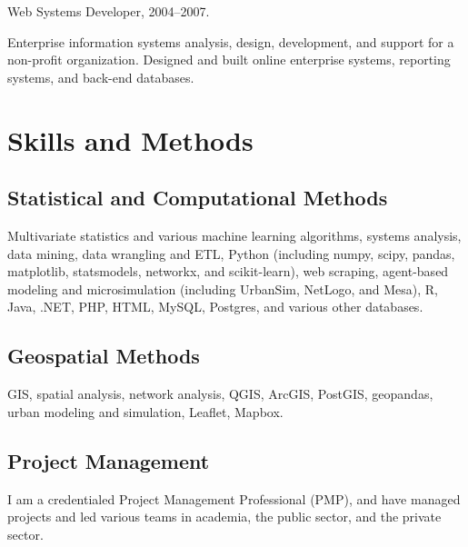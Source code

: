 \documentclass[11pt,letterpaper]{report}
\renewenvironment{itemize}{
  \begin{list}{}{
      \setlength{\leftmargin}{1.75em}
      \setlength{\itemsep}{0.25em}
      \setlength{\parskip}{0em}
      \setlength{\parsep}{0.25em}
    }
}{
  \end{list}
}
\begin{document}
\begin{itemize}
\item Web Systems Developer, 2004--2007.
\item Enterprise information systems analysis, design, development, and support for a non-profit organization. Designed and built online enterprise systems, reporting systems, and back-end databases.
\end{itemize}



\section*{Skills and Methods}

\subsection*{Statistical and Computational Methods}

\begin{itemize}
\item Multivariate statistics and various machine learning algorithms, systems analysis, data mining, data wrangling and ETL, Python (including numpy, scipy, pandas, matplotlib, statsmodels, networkx, and scikit-learn), web scraping, agent-based modeling and microsimulation (including UrbanSim, NetLogo, and Mesa), R, Java, .NET, PHP, HTML, MySQL, Postgres, and various other databases.
\end{itemize}

\subsection*{Geospatial Methods}

\begin{itemize}
\item GIS, spatial analysis, network analysis, QGIS, ArcGIS, PostGIS, geopandas, urban modeling and simulation, Leaflet, Mapbox.
\end{itemize}

\subsection*{Project Management}

\begin{itemize}
\item I am a credentialed Project Management Professional (PMP), and have managed projects and led various teams in academia, the public sector, and the private sector.
\end{itemize}
\end{document}
